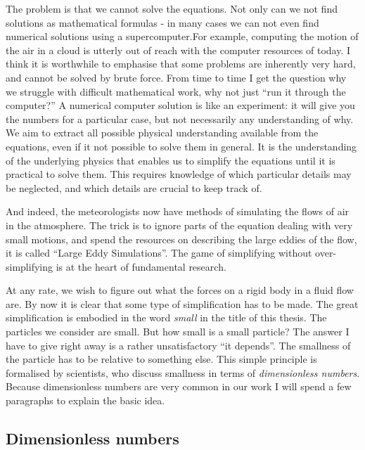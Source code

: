 \documentclass[thesis.tex]{subfiles}
\begin{document}
The problem is that we cannot solve the equations. Not only can we not find solutions as mathematical formulas - in many cases we can not even find numerical solutions using a supercomputer.For example, computing the motion of the air in a cloud is utterly out of reach with the computer resources of today. 
I think it is worthwhile to emphasise that some problems are inherently very hard, and cannot be solved by brute force. From time to time I get the question why we struggle with difficult mathematical work, why not just ``run it through the computer?'' A numerical computer solution is like an experiment: it will give you the numbers for a particular case, but not necessarily any understanding of why. We aim to extract all possible physical understanding available from the equations, even if it not possible to solve them in general. It is the understanding of the underlying physics that enables us to simplify the equations until it is practical to solve them. This requires knowledge of which particular details may be neglected, and which details are crucial to keep track of. 

And indeed, the meteorologists now have methods of simulating the flows of air in the atmosphere. The trick is to ignore parts of the equation dealing with very small motions, and spend the resources on describing the large eddies of the flow, it is called ``Large Eddy Simulations''. The game of simplifying without over-simplifying is at the heart of fundamental research.

At any rate, we wish to figure out what the forces on a rigid body in a fluid flow are. By now it is clear that some type of simplification has to be made. The great simplification is embodied in the word \emph{small} in the title of this thesis. The particles we consider are small. But how small is a small particle? The answer I have to give right away is a rather unsatisfactory ``it depends''. The smallness of the particle has to be relative to something else. This simple principle is formalised by scientists, who discuss smallness in terms of \emph{dimensionless numbers}. Because dimensionless numbers are very common in our work I will spend a few paragraphs to explain the basic idea.

\subsection*{Dimensionless numbers}
\end{document}
